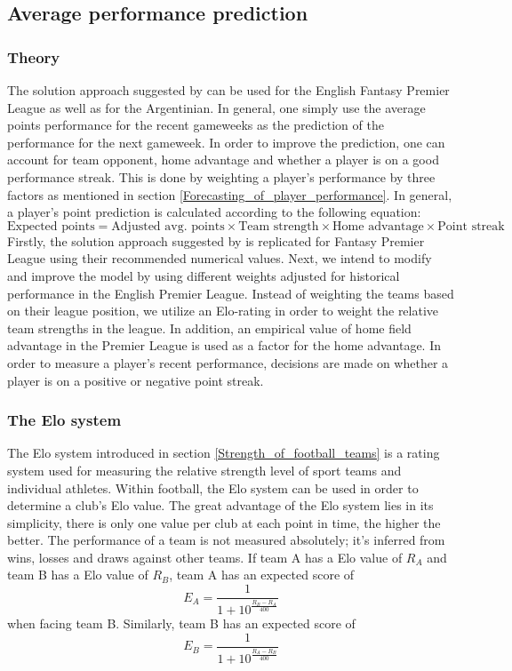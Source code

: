 \subsection{Average performance prediction}
\subsubsection{Theory}
The solution approach suggested by \cite{Bonomo} can be used for the English Fantasy Premier League as well as for the Argentinian. In general, one simply use the average points performance for the recent gameweeks as the prediction of the performance for the next gameweek. In order to improve the prediction, one can account for team opponent, home advantage and whether a player is on a good performance streak. This is done by weighting a player's performance by three factors as mentioned in section \ref{Forecasting_of_player_performance}.
\newpar
In general, a player's point prediction is calculated according to the following equation:
\begin{equation}
    \textrm{Expected points} = \textrm{Adjusted avg. points} \times \textrm{Team strength} \times \textrm{Home advantage} \times \textrm{Point streak}
\end{equation}
\newpar
Firstly, the solution approach suggested by \cite{Bonomo} is replicated for Fantasy Premier League using their recommended numerical values. Next, we intend to modify and improve the model by using different weights adjusted for historical performance in the English Premier League. Instead of weighting the teams based on their league position, we utilize an Elo-rating in order to weight the relative team strengths in the league. In addition, an empirical value of home field advantage in the Premier League is used as a factor for the home advantage. In order to measure a player's recent performance, decisions are made on whether a player is on a positive or negative point streak. 
\subsubsection{The Elo system}

The Elo system introduced in section \ref{Strength_of_football_teams} is a rating system used for measuring the relative strength level of sport teams and individual athletes. Within football, the Elo system can be used in order to determine a club's Elo value. The great advantage of the Elo system lies in its simplicity, there is only one value per club at each point in time, the higher the better. 
\newpar
The performance of a team is not measured absolutely; it's inferred from wins, losses and draws against other teams. If team A has a Elo value of $R_A$ and team B has a Elo value of $R_B$, team A has an expected score of 
\begin{equation}\label{eq5.2}
    E_A = \frac{1}{1+10^{\frac{R_B - R_A}{400}}}
\end{equation}
when facing team B. Similarly, team B has an expected score of
\begin{equation}\label{eq5.3}
    E_B = \frac{1}{1+10^{\frac{R_A - R_B}{400}}}
\end{equation}


